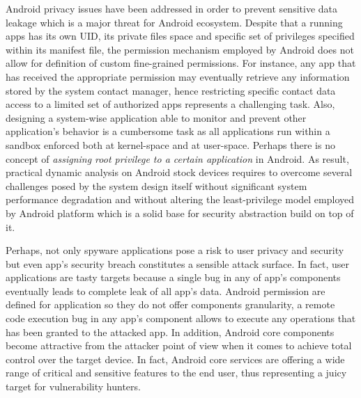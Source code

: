 Android privacy issues have been addressed in order to prevent sensitive data leakage which is a major threat for Android ecosystem. Despite that a running apps has its own UID, its private files space and specific set of privileges specified within its manifest file, the permission mechanism employed by Android does not allow for definition of custom fine-grained permissions. For instance, any app that has received the appropriate permission may eventually retrieve any information stored by the system contact manager, hence restricting specific contact data access to a limited set of authorized apps represents a challenging task. Also, designing a system-wise application able to monitor and prevent other application's behavior is a cumbersome task as all applications run within a sandbox enforced both at kernel-space and at user-space. Perhaps there is no concept of \textit{assigning root privilege to a certain application} in Android. As result, practical dynamic analysis on Android stock devices requires to overcome several challenges posed by the system design itself without significant system performance degradation and without altering the least-privilege model employed by Android platform which is a solid base for security abstraction build on top of it.

Perhaps, not only spyware applications pose a risk to user privacy and security but even app's security breach constitutes a sensible attack surface. In fact, user applications are tasty targets because a single bug in any of app's components eventually leads to complete leak of all app's data. Android permission are defined for application so they do not offer components granularity, a remote code execution bug in any app's component allows to execute any operations that has been granted to the attacked app. In addition, Android core components become attractive from the attacker point of view when it comes to achieve total control over the target device. In fact, Android core services are offering a wide range of critical and sensitive features to the end user, thus representing a juicy target for vulnerability hunters.

